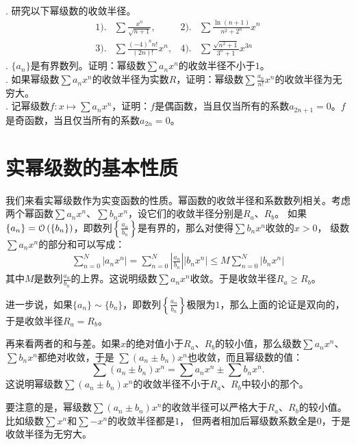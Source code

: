 \documentclass[12pt,UTF8]{ctexbook}
\begin{document}
\begin{xt}    
    \mbox{} \\
    . 研究以下幂级数的收敛半径。\\
    \begin{align*}
        1).& \sum \frac{x^n}{\sqrt{n+1}} ,  &2).& \sum \frac{\ln{(n+1)}}{n^2 + 2^n} x^n \\
        3).& \sum \frac{(-4)^n n!}{(2n)!} x^n,  & 4).& \sum \frac{\sqrt{n^2+1}}{3^n+1} x^{3n} 
    \end{align*}
    . $\{a_n\}$是有界数列。证明：幂级数$\sum a_n x^n$的收敛半径不小于$1$。\\
    . 如果幂级数$\sum a_n x^n$的收敛半径为实数$R$，证明：幂级数$\sum \frac{a_n}{n!} x^n$的收敛半径为无穷大。\\
    . 记幂级数$f: x\mapsto \sum a_n x^n $，证明：$f$是偶函数，当且仅当所有的系数$a_{2n+1} = 0$。$f$是奇函数，当且仅当所有的系数$a_{2n} = 0$。
\end{xt}

\section{实幂级数的基本性质}

我们来看实幂级数作为实变函数的性质。幂函数的收敛半径和系数数列相关。考虑两个幂函数$\sum a_n x^n$、$\sum b_n x^n$，设它们的收敛半径分别是$R_a$、$R_b$。
如果$\{a_n\} = \mathcal{O}\left(\{b_n\}\right)$，即数列$\left\{\frac{a_n}{b_n}\right\}$是有界的，那么对使得$\sum b_n x^n$收敛的$x>0$，
级数$\sum a_n x^n$的部分和可以写成：
\begin{align*}
    \sum_{n=0}^{N} |a_n x^n| = \sum_{n=0}^{N} \left|\frac{a_n}{b_n}\right| |b_n x^n| \leqslant M \sum_{n=0}^{N} |b_n x^n|
\end{align*}
其中$M$是数列$\frac{a_n}{b_n}$的上界。这说明级数$\sum a_n x^n$收敛。于是收敛半径$R_a \geqslant R_b$。

进一步说，如果$\{a_n\} \sim \{b_n\}$，即数列$\left\{\frac{a_n}{b_n}\right\}$极限为$1$，那么上面的论证是双向的，于是收敛半径$R_a = R_b$。

再来看两者的和与差。如果$x$的绝对值小于$R_a$、$R_b$的较小值，那么级数$\sum a_n x^n$、$\sum b_n x^n$都绝对收敛，于是
$\sum (a_n \pm b_n) x^n$也收敛，而且幂级数的值：
$$\sum (a_n \pm b_n) x^n = \sum a_n x^n \pm \sum b_n x^n.$$
这说明幂级数$\sum (a_n \pm b_n) x^n$的收敛半径不小于$R_a$、$R_b$中较小的那个。

要注意的是，幂级数$\sum (a_n \pm b_n) x^n$的收敛半径可以严格大于$R_a$、$R_b$的较小值。比如级数$\sum x^n$和$\sum -x^n$的收敛半径都是$1$，
但两者相加后幂级数系数全是$0$，于是收敛半径为无穷大。
\end{document}
